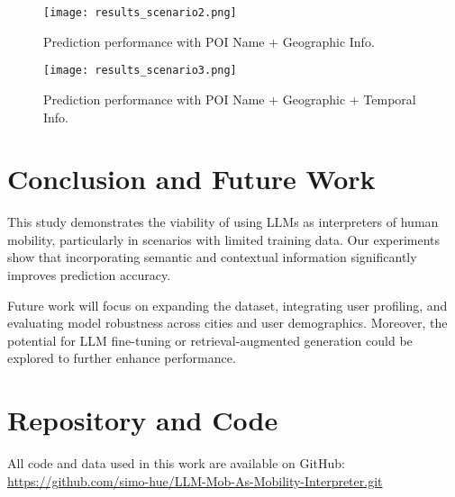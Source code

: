 \documentclass[a4paper,12pt]{article}
\begin{document}
\begin{figure}[H]
    \centering
    \texttt{[image: results\_scenario2.png]}
    \caption{Prediction performance with POI Name + Geographic Info.}
\end{figure}

\begin{figure}[H]
    \centering
    \texttt{[image: results\_scenario3.png]}
    \caption{Prediction performance with POI Name + Geographic + Temporal Info.}
\end{figure}

\section{Conclusion and Future Work}

This study demonstrates the viability of using LLMs as interpreters of human mobility, particularly in scenarios with limited training data. Our experiments show that incorporating semantic and contextual information significantly improves prediction accuracy.

Future work will focus on expanding the dataset, integrating user profiling, and evaluating model robustness across cities and user demographics. Moreover, the potential for LLM fine-tuning or retrieval-augmented generation could be explored to further enhance performance.

\section*{Repository and Code}

All code and data used in this work are available on GitHub:\\
\url{https://github.com/simo-hue/LLM-Mob-As-Mobility-Interpreter.git}
\end{document}
